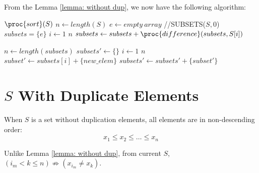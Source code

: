\documentclass[a4paper, titlepage]{article}
\begin{document}
From the Lemma \ref{lemma: without dup}, we now have the following algorithm:

\begin{codebox}
\li $\proc{sort}(S)$
\li $n \gets length(S)$
\li $e \gets empty\ array$ //SUBSETS($S, 0$)
\li $subsets = \{e\}$
\li \For $i \gets 1$ \To $n$
\li 	\Do $subsets \gets subsets + \proc{difference}(subsets, S[i])$
       \End
\li {}
\end{codebox}

\begin{codebox}
\li $n \gets length(subsets)$
\li $subsets' \gets \{\}$
\li \For $i \gets 1$ \To $n$
\li 	\Do $subset' \gets subsets[i] + \{new\_elem\}$
\li 		$subsets' \gets subsets' + \{subset'\}$ 
		\End
\li {}
\end{codebox}
		
\section{$S$ With Duplicate Elements}
When $S$ is a set without duplication elements, all elements are in non-descending order:
\[
 x_1 \leq x_2 \leq \dots \leq x_n 
\]

Unlike Lemma \ref{lemma: without dup}, from current $S$, $(i_m < k \leq n) \not\Rightarrow (x_{i_m} \neq x_k)$. 
\end{document}
